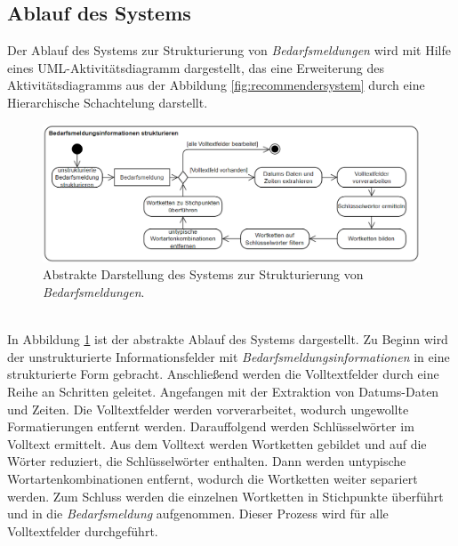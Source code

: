 \subsection{Ablauf des Systems}
Der Ablauf des Systems zur Strukturierung von \emph{Bedarfsmeldungen} wird mit Hilfe eines UML-Aktivitätsdiagramm dargestellt, das eine Erweiterung des Aktivitätsdiagramms aus der Abbildung \ref{fig:recommendersystem} durch eine Hierarchische Schachtelung darstellt.
\begin{figure}[H]
	\centering  
	\includegraphics[width=\linewidth]{Abbildungen/bedarfsmeldungstrukturieren.png}
	\caption{Abstrakte Darstellung des Systems zur Strukturierung von \emph{Bedarfsmeldungen}.}
	\label{fig:ablaufsystemabstrakt}
\end{figure}\mbox{} \\
In Abbildung \ref{fig:ablaufsystemabstrakt} ist der abstrakte Ablauf des Systems dargestellt. Zu Beginn wird der unstrukturierte Informationsfelder mit \emph{Bedarfsmeldungsinformationen} in eine strukturierte Form gebracht. Anschließend werden die Volltextfelder durch eine Reihe an Schritten geleitet. Angefangen mit der Extraktion von Datums-Daten und Zeiten. Die Volltextfelder werden vorverarbeitet, wodurch ungewollte Formatierungen entfernt werden. Darauffolgend werden Schlüsselwörter im Volltext ermittelt. Aus dem Volltext werden Wortketten gebildet und auf die Wörter reduziert, die Schlüsselwörter enthalten. Dann werden untypische Wortartenkombinationen entfernt, wodurch die Wortketten weiter separiert werden. Zum Schluss werden die einzelnen Wortketten in Stichpunkte überführt und in die \emph{Bedarfsmeldung} aufgenommen. Dieser Prozess wird für alle Volltextfelder durchgeführt.